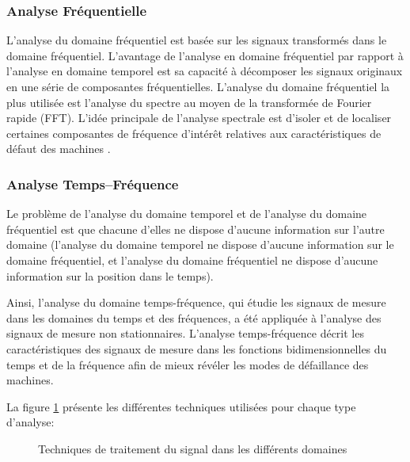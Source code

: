 \subsubsection{Analyse Fréquentielle}
L'analyse du domaine fréquentiel est basée sur les signaux transformés dans le domaine fréquentiel. L'avantage de l'analyse en domaine fréquentiel par rapport à l'analyse en domaine temporel est sa capacité à décomposer les signaux originaux en une série de composantes fréquentielles. L'analyse du domaine fréquentiel la plus utilisée est l'analyse du spectre au moyen de la transformée de Fourier rapide (FFT). L'idée principale de l'analyse spectrale est d'isoler et de localiser certaines composantes de fréquence d'intérêt relatives aux caractéristiques de défaut des machines \cite{Lei2016a}.


\subsubsection{Analyse Temps–Fréquence}
Le problème de l'analyse du domaine temporel et de l'analyse du domaine fréquentiel est que chacune d'elles ne dispose d'aucune information sur l'autre domaine (l'analyse du domaine temporel ne dispose d'aucune information sur le domaine fréquentiel, et l'analyse du domaine fréquentiel ne dispose d'aucune information sur la position dans le temps).

Ainsi, l'analyse du domaine temps-fréquence, qui
étudie les signaux de mesure dans les domaines du temps et des fréquences, a été appliquée à l'analyse des signaux de mesure non stationnaires. L'analyse temps-fréquence décrit les caractéristiques des signaux de mesure dans les fonctions bidimensionnelles du temps et de la fréquence afin de mieux révéler les modes de défaillance des machines.


La figure \ref{fig:signal-processing} présente les différentes techniques utilisées pour chaque type d'analyse:

\begin{figure}[h]
    \centering
	
    \caption{Techniques de traitement du signal dans les différents domaines}
    \label{fig:signal-processing}
\end{figure}

